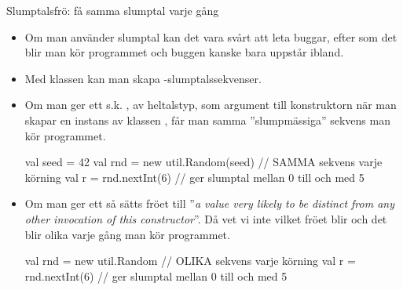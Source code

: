 \begin{Slide}{Slumptalsfrö: få samma slumptal varje gång}\SlideFontTiny
\begin{itemize}
\item Om man använder slumptal kan det vara svårt att leta buggar, efter som det blir  man kör programmet och buggen kanske bara uppstår ibland.

\item Med klassen  kan man skapa -slumptalssekvenser.
\pause
\item Om man ger ett s.k.  , av heltalstyp, som argument till konstruktorn när man skapar en instans av klassen , får man samma ''slumpmässiga'' sekvens  man kör programmet.

\begin{Code}
  val seed = 42
  val rnd = new util.Random(seed) // SAMMA sekvens varje körning
  val r = rnd.nextInt(6) // ger slumptal mellan 0 till och med 5
\end{Code}
\pause
\item Om man  ger ett  så sätts fröet till ''\emph{a value very likely to be distinct from any other invocation of this constructor}''. Då vet vi inte vilket fröet blir och det blir olika varje gång man kör programmet.
\begin{Code}
  val rnd = new util.Random // OLIKA sekvens varje körning
  val r = rnd.nextInt(6) // ger slumptal mellan 0 till och med 5
\end{Code}
\pause
\end{itemize}
\end{Slide}

%
%
%
%




